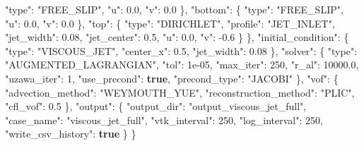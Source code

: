 \documentclass[
  10pt,
]{article}
\newenvironment{Shaded}{}{}
\newcommand{\DataTypeTok}[1]{\textcolor[rgb]{0.56,0.13,0.00}{#1}}
\newcommand{\DecValTok}[1]{\textcolor[rgb]{0.25,0.63,0.44}{#1}}
\newcommand{\FloatTok}[1]{\textcolor[rgb]{0.25,0.63,0.44}{#1}}
\newcommand{\FunctionTok}[1]{\textcolor[rgb]{0.02,0.16,0.49}{#1}}
\newcommand{\KeywordTok}[1]{\textcolor[rgb]{0.00,0.44,0.13}{\textbf{#1}}}
\newcommand{\StringTok}[1]{\textcolor[rgb]{0.25,0.44,0.63}{#1}}
\begin{document}
\begin{Shaded}
\begin{Highlighting}[]
      \DataTypeTok{"type"}\FunctionTok{:} \StringTok{"FREE\_SLIP"}\FunctionTok{,}
      \DataTypeTok{"u"}\FunctionTok{:} \FloatTok{0.0}\FunctionTok{,}
      \DataTypeTok{"v"}\FunctionTok{:} \FloatTok{0.0}
    \FunctionTok{\},}
    \DataTypeTok{"bottom"}\FunctionTok{:} \FunctionTok{\{}
      \DataTypeTok{"type"}\FunctionTok{:} \StringTok{"FREE\_SLIP"}\FunctionTok{,}
      \DataTypeTok{"u"}\FunctionTok{:} \FloatTok{0.0}\FunctionTok{,}
      \DataTypeTok{"v"}\FunctionTok{:} \FloatTok{0.0}
    \FunctionTok{\},}
    \DataTypeTok{"top"}\FunctionTok{:} \FunctionTok{\{}
      \DataTypeTok{"type"}\FunctionTok{:} \StringTok{"DIRICHLET"}\FunctionTok{,}
      \DataTypeTok{"profile"}\FunctionTok{:} \StringTok{"JET\_INLET"}\FunctionTok{,}
      \DataTypeTok{"jet\_width"}\FunctionTok{:} \FloatTok{0.08}\FunctionTok{,}
      \DataTypeTok{"jet\_center"}\FunctionTok{:} \FloatTok{0.5}\FunctionTok{,}
      \DataTypeTok{"u"}\FunctionTok{:} \FloatTok{0.0}\FunctionTok{,}
      \DataTypeTok{"v"}\FunctionTok{:} \FloatTok{{-}0.6}
    \FunctionTok{\}}
  \FunctionTok{\},}
  \DataTypeTok{"initial\_condition"}\FunctionTok{:} \FunctionTok{\{}
    \DataTypeTok{"type"}\FunctionTok{:} \StringTok{"VISCOUS\_JET"}\FunctionTok{,}
    \DataTypeTok{"center\_x"}\FunctionTok{:} \FloatTok{0.5}\FunctionTok{,}
    \DataTypeTok{"jet\_width"}\FunctionTok{:} \FloatTok{0.08}
  \FunctionTok{\},}
  \DataTypeTok{"solver"}\FunctionTok{:} \FunctionTok{\{}
    \DataTypeTok{"type"}\FunctionTok{:} \StringTok{"AUGMENTED\_LAGRANGIAN"}\FunctionTok{,}
    \DataTypeTok{"tol"}\FunctionTok{:} \DecValTok{1e{-}05}\FunctionTok{,}
    \DataTypeTok{"max\_iter"}\FunctionTok{:} \DecValTok{250}\FunctionTok{,}
    \DataTypeTok{"r\_al"}\FunctionTok{:} \FloatTok{10000.0}\FunctionTok{,}
    \DataTypeTok{"uzawa\_iter"}\FunctionTok{:} \DecValTok{1}\FunctionTok{,}
    \DataTypeTok{"use\_precond"}\FunctionTok{:} \KeywordTok{true}\FunctionTok{,}
    \DataTypeTok{"precond\_type"}\FunctionTok{:} \StringTok{"JACOBI"}
  \FunctionTok{\},}
  \DataTypeTok{"vof"}\FunctionTok{:} \FunctionTok{\{}
    \DataTypeTok{"advection\_method"}\FunctionTok{:} \StringTok{"WEYMOUTH\_YUE"}\FunctionTok{,}
    \DataTypeTok{"reconstruction\_method"}\FunctionTok{:} \StringTok{"PLIC"}\FunctionTok{,}
    \DataTypeTok{"cfl\_vof"}\FunctionTok{:} \FloatTok{0.5}
  \FunctionTok{\},}
  \DataTypeTok{"output"}\FunctionTok{:} \FunctionTok{\{}
    \DataTypeTok{"output\_dir"}\FunctionTok{:} \StringTok{"output\_viscous\_jet\_full"}\FunctionTok{,}
    \DataTypeTok{"case\_name"}\FunctionTok{:} \StringTok{"viscous\_jet\_full"}\FunctionTok{,}
    \DataTypeTok{"vtk\_interval"}\FunctionTok{:} \DecValTok{250}\FunctionTok{,}
    \DataTypeTok{"log\_interval"}\FunctionTok{:} \DecValTok{250}\FunctionTok{,}
    \DataTypeTok{"write\_csv\_history"}\FunctionTok{:} \KeywordTok{true}
  \FunctionTok{\}}
\FunctionTok{\}}
\end{Highlighting}
\end{Shaded}
\end{document}
